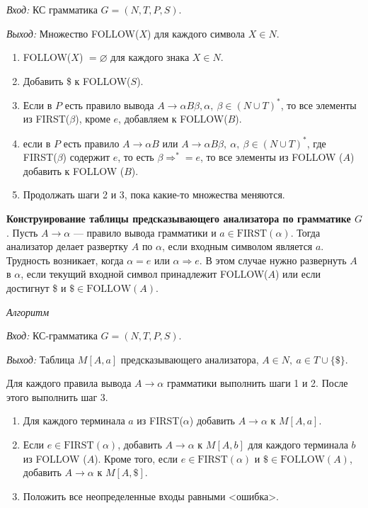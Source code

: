 \textit{Вход:} КС грамматика $G = (N, T, P, S)$.

\textit{Выход:} Множество FOLLOW($X$) для каждого символа $X \in N$.

\begin{enumerate}
    \item FOLLOW($X$) $= \varnothing$ для каждого знака $X \in N$.
    \item Добавить \$ к FOLLOW($S$).
    \item Если в $P$ есть правило вывода $A \rightarrow \alpha B \beta, \alpha,~\beta \in (N \cup T)^\ast$, то все элементы из FIRST($\beta$), кроме $e$, добавляем к FOLLOW($B$).
    \item если в $P$ есть правило $A \rightarrow \alpha B$ или $A \rightarrow \alpha B \beta,~\alpha,~\beta \in (N \cup T)^\ast$, где FIRST($\beta$) содержит $e$, то есть $\beta \Rightarrow^\ast = e$, то все элементы из FOLLOW ($A$) добавить к FOLLOW ($B$).
    \item Продолжать шаги 2 и 3, пока какие-то множества меняются.
\end{enumerate}

\textbf{Конструирование таблицы предсказывающего анализатора по грамматике $G$}.
Пусть $A \rightarrow \alpha$ --- правило вывода грамматики и $a \in \text{FIRST}(\alpha)$. 
Тогда анализатор делает развертку $A$ по $\alpha$, если входным символом является $a$. 
Трудность возникает, когда $\alpha = e$ или $\alpha \Rightarrow e$. 
В этом случае нужно развернуть $A$ в $\alpha$, если текущий входной символ принадлежит FOLLOW($A$) или если достигнут \$ и $\$ \in \text{FOLLOW}(A)$.

\textit{Алгоритм}

\textit{Вход:} КС-грамматика $G = (N, T, P, S)$.

\textit{Выход:} Таблица $M[A, a]$ предсказывающего анализатора, $A \in N,~a \in T \cup \{\$\}$.

Для каждого правила вывода $A \rightarrow \alpha$ грамматики выполнить шаги 1 и 2. После этого выполнить шаг 3.
\begin{enumerate}
    \item Для каждого терминала $a$ из FIRST($\alpha$) добавить $A \rightarrow \alpha$ к $M[A, a]$.
    \item Если $e \in \text{FIRST}(\alpha)$, добавить $A \rightarrow \alpha$ к $M[A, b]$ для каждого терминала $b$ из FOLLOW ($A$).
    Кроме того, если $e \in \text{FIRST}(\alpha)$ и $\$ \in \text{FOLLOW}(A)$, добавить $A \rightarrow \alpha$ к $M[A, \$]$.
    \item Положить все неопределенные входы равными <ошибка>. 
\end{enumerate}

